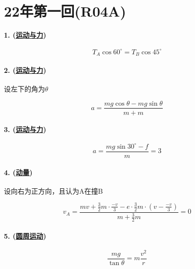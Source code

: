 
\section{22年第一回(R04A)}

\paragraph{1. (\hyperref[subsec:运动与力]{运动与力})}

\begin{equation*}
    T_A\cos60^\circ=T_B\cos45^\circ
\end{equation*}

\paragraph{2. (\hyperref[subsec:运动与力]{运动与力})}
设左下的角为$\theta$

\begin{equation*}
    a=\frac{mg\cos\theta-mg\sin\theta}{m+m}
\end{equation*}

\paragraph{3. (\hyperref[subsec:运动与力]{运动与力})}

\begin{equation*}
    a=\frac{mg\sin30^\circ-f}{m}=3
\end{equation*}

\paragraph{4. (\hyperref[subsec:动量]{动量})} 设向右为正方向，且认为A在撞B

\begin{equation*}
    v_A=\frac{mv+\frac32m\cdot\frac{-v}{3}-e\cdot\frac32m\cdot(v-\frac{-v}{3})}{m+\frac32m}=0
\end{equation*}

\paragraph{5. (\hyperref[subsec:圆周运动]{圆周运动})}

\begin{equation*}
    \frac{mg}{\tan\theta}=m\frac{v^2}{r}
\end{equation*}


